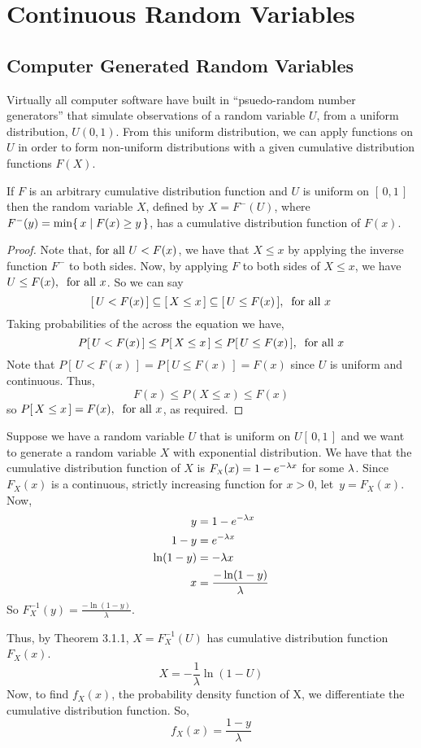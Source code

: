 \chapter{Continuous Random Variables}

\section{Computer Generated Random Variables}
Virtually all computer software have built in ``psuedo-random number generators'' that simulate observations of a random variable $U$, from a uniform distribution, $U(0,1)$. From this uniform distribution, we can apply functions on $U$ in order to form non-uniform distributions with a given cumulative distribution functions $F(X)$.
\begin{theorem}
If $F$ is an arbitrary cumulative distribution function and $U$ is uniform on $[\,0,1\,]$ then the random variable $X$, defined by $X = F^-(U)$, where $F^-(y) = \min\{\, x \mid F(x)\ge y \,\}$, has a cumulative distribution function of $F(x)$. 
\end{theorem}

\begin{proof}
Note that,$ \text{ for }\text{all } U < F(x)$, we have that $X \leq x$ by applying the inverse function $F^-$ to both sides. Now, by applying $F$ to both sides of $X \leq x$, we have $U \leq F(x),\:\text{ for }\text{all } x$. So we can say
\[
    [\,U < F(x)\,] \subseteq [\,X \leq x\,] \subseteq [\,U \leq F(x)\,],\:\text{ for }\text{all } x
\]
Taking probabilities of the across the equation we have, 
\[
    P[\,U < F(x)\,] \leq P[\,X \leq x\,] \leq P[\,U \leq F(x)\,],\:\text{ for }\text{all } x
\]
Note that $P[\,U < F(x)\,] = P[U \leq F(x)\,] = F(x)$ since $U$ is uniform and continuous. Thus,
\[
    F(x) \leq P(X \leq x) \leq F(x)
\]
so $P[\,X \leq x\,] = F(x),\:\text{ for }\text{all } x$, as required.
\end{proof}

\begin{example}
Suppose we have a random variable $U$ that is uniform on $U[\,0,1\,]$ and we want to generate a random variable $X$ with exponential distribution. We have that the cumulative distribution function of $X$ is $F_{\scriptscriptstyle X}(x) = 1 - e^{-\lambda x}$ for some $\lambda$.
Since $F_{\scriptscriptstyle X}(x)$ is a continuous, strictly increasing function for $x>0$, let~$y=F_{\scriptscriptstyle X}(x)$. Now,
\begin{align*}
    y&=1-e^{-\lambda x} \\
    1-y&=e^{-\lambda x} \\
    \ln(1-y)&=-\lambda x \\
    x&=\frac{-\ln(1-y)}{\lambda}
\end{align*}
So $F^{-1}_{\scriptscriptstyle X}(y) = \displaystyle\frac{-\ln(1-y)}{\lambda}$.

Thus, by Theorem 3.1.1, $X=F^{-1}_{\scriptscriptstyle X}(U)$ has cumulative distribution function $F_{\scriptscriptstyle X}(x)$.
\[
    X = -\frac{1}{\lambda}\ln(1-U)
\]
Now, to find $f_{\scriptscriptstyle X}(x)$, the probability density function of X, we differentiate the cumulative distribution function. So,
\[
    f_{\scriptscriptstyle X}(x) = \frac{1 - y}{\lambda}
\]    
\end{example}
\pagebreak[3]
